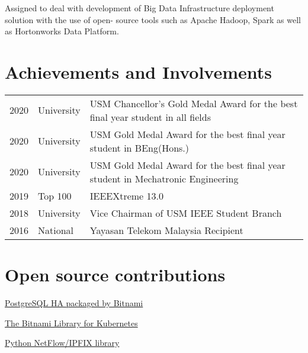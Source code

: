 \documentclass[letterpaper]{deedy-resume} %
\begin{document}
\begin{minipage}[t]{0.66\textwidth}
\sectionspace %


\begin{tightitemize}
\item Assigned to deal with development of Big Data Infrastructure deployment solution with the use of open-
source tools such as Apache Hadoop, Spark as well as Hortonworks Data Platform.
\end{tightitemize}

\sectionspace %

\section{Achievements and Involvements} 

\begin{tabular}{rlp{}}
2020	 & University & USM Chancellor's Gold Medal Award for the best final year student in all fields\\
2020	 & University & USM Gold Medal Award for the best final year student in BEng(Hons.)\\
2020	 & University & USM Gold Medal Award for the best final year student in Mechatronic Engineering\\
2019	 & Top 100 & IEEEXtreme 13.0\\
2018 	 & University & Vice Chairman of USM IEEE Student Branch\\
2016	 & National & Yayasan Telekom Malaysia Recipient\\
\end{tabular}

\sectionspace

\section{Open source contributions} 
\vspace{\topsep}
\begin{tightitemize}
\item \href{https://github.com/bitnami/bitnami-docker-postgresql-repmgr}{PostgreSQL HA packaged by Bitnami} 
\item \href{https://github.com/bitnami/charts}{The Bitnami Library for Kubernetes}
\item \href{https://github.com/bitkeks/python-netflow-v9-softflowd}{Python NetFlow/IPFIX library}
\end{tightitemize}


\end{minipage} %
\end{document}
